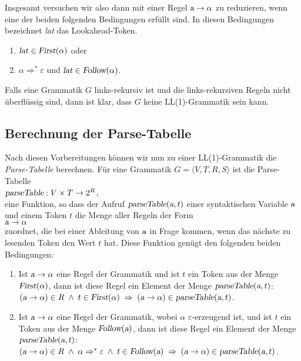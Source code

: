 Insgesamt versuchen wir also dann mit einer Regel $\textsl{a} \rightarrow \alpha$ zu reduzieren,
wenn eine der beiden folgenden Bedingungen erfüllt sind.  In diesen Bedingungen bezeichnet
\textsl{lat} das Lookahead-Token.
\begin{enumerate}
\item $\textsl{lat} \in \textsl{First}(\alpha)$ \quad oder
\item $\alpha \Rightarrow^* \varepsilon$ und $\textsl{lat} \in \textsl{Follow}(\alpha)$.
\end{enumerate}

\remark
Falls eine Grammatik $G$ links-rekursiv ist und die links-rekursiven Regeln nicht 
überflüssig sind, dann ist klar, dass $G$ keine LL(1)-Grammatik sein kann.


\subsection{Berechnung der Parse-Tabelle}
Nach diesen Vorbereitungen können wir nun zu einer LL(1)-Grammatik die \emph{Parse-Tabelle}
berechnen.  Für eine Grammatik $G = \langle V, T, R, S \rangle$ ist die Parse-Tabelle
\\[0.2cm]
\hspace*{1.3cm}
$\textsl{parseTable}: V \times T \rightarrow 2^R$,
\\[0.2cm]
eine Funktion, so dass der Aufruf $\textsl{parseTable}(\textsl{a},t)$ einer syntaktischen Variable $\textsl{a}$ und
einem Token $t$ die Menge aller Regeln der Form  
\\[0.2cm]
\hspace*{1.3cm}
$\textsl{a} \rightarrow \alpha$
\\[0.2cm]
zuordnet, die bei einer Ableitung von $\textsl{a}$ in Frage kommen, wenn das nächste zu lesenden Token den
Wert $t$ hat.  Diese Funktion genügt den folgenden beiden Bedingungen:
\begin{enumerate}
\item Ist  $\textsl{a} \rightarrow \alpha$ eine Regel der Grammatik und ist $t$ ein Token aus der Menge 
      $\textsl{First}(\alpha)$, dann ist diese Regel ein Element der Menge
      $\textsl{parseTable}(\textsl{a},t)$:
      \\[0.2cm]
      \hspace*{1.3cm}
      $(\textsl{a} \rightarrow \alpha) \in R \; \wedge \; t \in \textsl{First}(\alpha) 
      \;\Rightarrow\; (\textsl{a} \rightarrow \alpha) \in \textsl{parseTable}(\textsl{a},t)$.
\item Ist $\textsl{a} \rightarrow \alpha$ eine Regel der Grammatik, wobei $\alpha$ 
      $\varepsilon$-erzeugend ist, und ist $t$ ein Token aus der Menge 
      $\textsl{Follow}(\textsl{a})$, dann ist diese Regel ein Element der Menge
      $\textsl{parseTable}(\textsl{a},t)$:
      \\[0.2cm]
      \hspace*{1.3cm}
      $(\textsl{a} \rightarrow \alpha) \in R \; \wedge \; \alpha \Rightarrow^* \varepsilon 
       \;\wedge\;t \in \textsl{Follow}(\textsl{a}) 
       \;\Rightarrow\; (\textsl{a} \rightarrow \alpha) \in \textsl{parseTable}(\textsl{a},t)$.
\end{enumerate}
